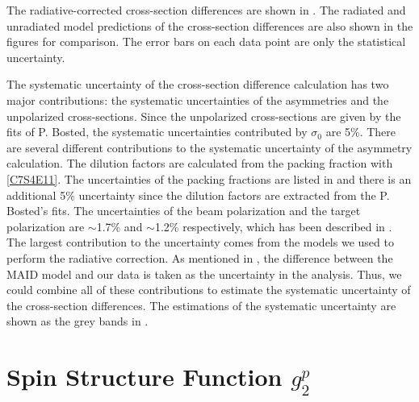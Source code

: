 The radiative-corrected cross-section differences are shown in . The radiated and unradiated model predictions of the cross-section differences are also shown in the figures for comparison. The error bars on each data point are only the statistical uncertainty.

The systematic uncertainty of the cross-section difference calculation has two major contributions: the systematic uncertainties of the asymmetries and the unpolarized cross-sections. Since the unpolarized cross-sections are given by the fits of P. Bosted, the systematic uncertainties contributed by $\sigma_0$ are 5\%. There are several different contributions to the systematic uncertainty of the asymmetry calculation. The dilution factors are calculated from the packing fraction with \cref{C7S4E11}. The uncertainties of the packing fractions are listed in  and there is an additional 5\% uncertainty since the dilution factors are extracted from the P. Bosted's fits. The uncertainties of the beam polarization and the target polarization are $\sim$1.7\% and $\sim$1.2\% respectively, which has been described in . The largest contribution to the uncertainty comes from the models we used to perform the radiative correction. As mentioned in , the difference between the MAID model and our data is taken as the uncertainty in the analysis. Thus, we could combine all of these contributions to estimate the systematic uncertainty of the cross-section differences. The estimations of the systematic uncertainty are shown as the grey bands in .

\section{\texorpdfstring{Spin Structure Function $g_2^p$}{Spin Structure Function g2p}}
\label{C8S4}

